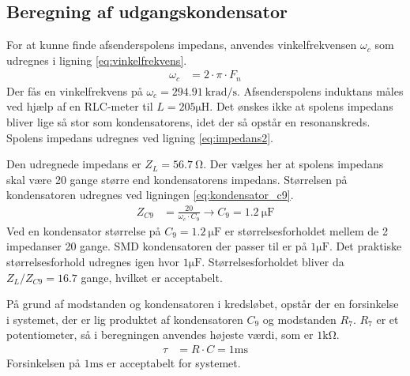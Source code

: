 \subsection{Beregning af udgangskondensator}
For at kunne finde afsenderspolens impedans, anvendes vinkelfrekvensen $\omega_c$ som udregnes i ligning \ref{eq:vinkelfrekvens}.
\begin{align}
	\omega_c & = 2 \cdot \pi \cdot F_n \label{eq:vinkelfrekvens}
\end{align}
Der fås en vinkelfrekvens på $\omega_c = \SI{294.91}{\kilo\radian\per\second}$.
Afsenderspolens induktans måles ved hjælp af en RLC-meter til $L = 205\si{\micro \henry}$.
Det ønskes ikke at spolens impedans bliver lige så stor som kondensatorens, idet der så opstår en resonanskreds. 
Spolens impedans udregnes ved ligning \ref{eq:impedans2}.

Den udregnede impedans er $Z_L = \SI{56.7}{\ohm}$.
Der vælges her at spolens impedans skal være 20 gange større end kondensatorens impedans. Størrelsen på kondensatoren udregnes ved ligningen \ref{eq:kondensator_c9}.
\begin{align}
	Z_{C9} & = \frac{20}{\omega_c \cdot C_9} \rightarrow C_9 = \SI{1.2}{\micro\farad} \label{eq:kondensator_c9}
\end{align}
Ved en kondensator størrelse på $C_9 = \SI{1.2}{\micro\farad}$ er størrelsesforholdet mellem de 2 impedanser 20 gange. 
SMD kondensatoren der passer til er på $ 1\si{\micro\farad}$. Det praktiske størrelsesforhold udregnes igen hvor $ 1\si{\micro\farad}$. Størrelsesforholdet bliver da $\si{Z_L \per Z_{C9}} = \num{16.7}$ gange, hvilket er acceptabelt.

På grund af modstanden og kondensatoren i kredsløbet, opstår der en forsinkelse i systemet, der er lig produktet af kondensatoren $C_9$ og modstanden $R_7$. $R_7$ er et potentiometer, så i beregningen anvendes højeste værdi, som er $1\si{\kilo\ohm}$.
\begin{align}
	\tau & = R \cdot C = 1 \si{\milli\second}
\end{align}
Forsinkelsen på $1 \si{\milli\second}$ er acceptabelt for systemet.

